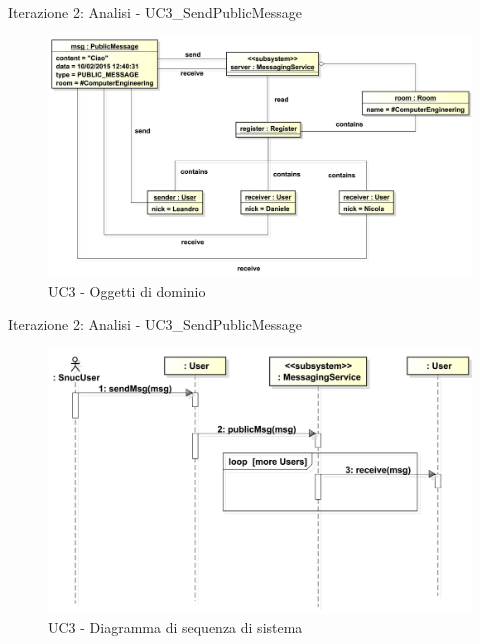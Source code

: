 \begin{frame} {Iterazione 2: Analisi - UC3\_SendPublicMessage}
   \begin{figure}
     \includegraphics[scale=0.225]{image_astah/Iteration_2_DomainModel/UC3_SendPublicMessage_OM.png}{\centering}
     \caption{UC3 - Oggetti di dominio}
     \label{fig_UC3_SPM_OM} 
   \end{figure}
\end{frame}

\begin{frame} {Iterazione 2: Analisi - UC3\_SendPublicMessage}
   \begin{figure}
     \includegraphics[scale=0.27]{image_astah/Iteration_2_DomainModel/UC3_SendPublicMessage_SSD.png}{\centering}
     \caption{UC3 - Diagramma di sequenza di sistema}
     \label{fig_UC3_SPM_SSD} 
   \end{figure}
\end{frame}

